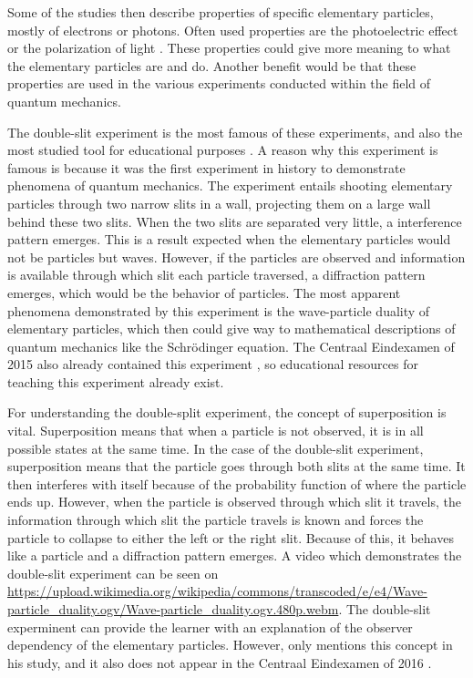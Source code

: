\documentclass[11pt,twoside]{report} %
\begin{document}
Some of the studies \cite{erduran, hubber, muller, thacker} then describe properties of specific elementary particles, mostly of electrons or photons. Often used properties are the photoelectric effect or the polarization of light \cite{henriksen, mckagan, muller}. These properties could give more meaning to what the elementary particles are and do. Another benefit would be that these properties are used in the various experiments conducted within the field of quantum mechanics.

The double-slit experiment is the most famous of these experiments, and also the most studied tool for educational purposes \cite{asikainen, henriksen, hobson, levrini, mckagan, muller, papaphotis1,singh2, thacker}. A reason why this experiment is famous is because it was the first experiment in history to demonstrate phenomena of quantum mechanics. The experiment entails shooting elementary particles through two narrow slits in a wall, projecting them on a large wall behind these two slits. When the two slits are separated very little, a interference pattern emerges. This is a result expected when the elementary particles would not be particles but waves. However, if the particles are observed and information is available through which slit each particle traversed, a diffraction pattern emerges, which would be the behavior of particles. The most apparent phenomena demonstrated by this experiment is the wave-particle duality of elementary particles, which then could give way to mathematical descriptions of quantum mechanics like the Schrödinger equation. The Centraal Eindexamen of 2015 also already contained this experiment \cite{eindexamen2015}, so educational resources for teaching this experiment already exist.

For understanding the double-split experiment, the concept of superposition is vital. Superposition means that when a particle is not observed, it is in all possible states at the same time. In the case of the double-slit experiment, superposition means that the particle goes through both slits at the same time. It then interferes with itself because of the probability function of where the particle ends up. However, when the particle is observed through which slit it travels, the information through which slit the particle travels is known and forces the particle to collapse to either the left or the right slit. Because of this, it behaves like a particle and a diffraction pattern emerges. A video which demonstrates the double-slit experiment can be seen on \url{https://upload.wikimedia.org/wikipedia/commons/transcoded/e/e4/Wave-particle_duality.ogv/Wave-particle_duality.ogv.480p.webm}. The double-slit experminent can provide the learner with an explanation of the observer dependency of the elementary particles. However, only  mentions this concept in his study, and it also does not appear in the Centraal Eindexamen of 2016 \cite{eindexamen2016}.
\end{document}
